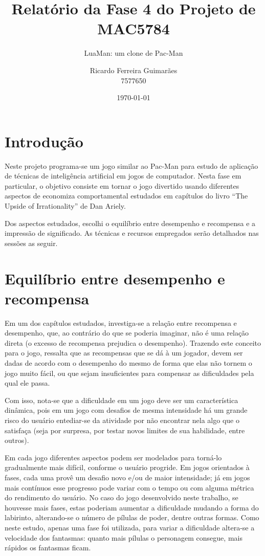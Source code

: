 \documentclass[a4paper]{scrartcl}
\title{Relatório da Fase 4 do Projeto de MAC5784}
\subtitle{LuaMan: um clone de Pac-Man}
\author{Ricardo Ferreira Guimarães \\ 7577650}
\date{\today}
\begin{document}
\maketitle

\section{Introdução}

Neste projeto programa-se um jogo similar ao Pac-Man para estudo de aplicação de
técnicas de inteligência artificial em jogos de computador. Nesta fase em particular,
o objetivo consiste em tornar o jogo divertido usando diferentes aspectos de economiza comportamental estudados
em capítulos do livro ``The Upside of Irrationality'' de Dan Ariely.

Dos aspectos estudados, escolhi o equilíbrio entre desempenho e recompensa e 
a impressão de significado. As técnicas e recursos empregados serão detalhados
nas sessões as seguir.

\section{Equilíbrio entre desempenho e recompensa}

Em um dos capítulos estudados, investiga-se a relação entre recompensa e desempenho,
que, ao contrário do que se poderia imaginar, não é uma relação direta (o excesso
de recompensa prejudica o desempenho). Trazendo este conceito para o jogo, ressalta que
as recompensas que se dá à um jogador, devem ser dadas de acordo com o desempenho do mesmo de forma
que elas não tornem o jogo muito fácil, ou que sejam insuficientes para compensar as dificuldades pela
qual ele passa.

Com isso, nota-se que a dificuldade em um jogo deve ser um característica dinâmica, pois
em um jogo com desafios de mesma intensidade há um grande risco do usuário entediar-se da
atividade por não encontrar nela algo que o satisfaça (seja por surpresa, por testar novos limites
de sua habilidade, entre outros).

Em cada jogo diferentes aspectos podem ser modelados para torná-lo gradualmente mais difícil, conforme
o usuário progride. Em jogos orientados à fases, cada uma provê um desafio novo e/ou de maior intensidade;
já em jogos mais contínuos esse progresso pode variar com o tempo ou com alguma métrica do rendimento do 
usuário. No caso do jogo desenvolvido neste trabalho, se houvesse mais fases, estas poderiam aumentar a dificuldade
mudando a forma do labirinto, alterando-se o número de pílulas de poder, dentre outras formas. Como neste estudo, apenas
uma fase foi utilizada, para variar a dificuldade altera-se a velocidade dos fantasmas: quanto mais pílulas o personagem
consegue, mais rápidos os fantasmas ficam.
\end{document}
